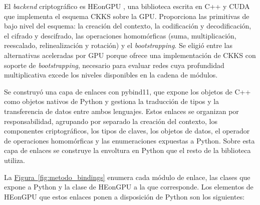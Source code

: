 El \textit{backend} criptográfico es HEonGPU \cite{HEonGPU}, una biblioteca escrita en C++ y CUDA que implementa el esquema CKKS sobre la GPU. Proporciona las primitivas de bajo nivel del esquema: la creación del contexto, la codificación y decodificación, el cifrado y descifrado, las operaciones homomórficas (suma, multiplicación, reescalado, relinealización y rotación) y el \textit{bootstrapping}. Se eligió entre las alternativas aceleradas por GPU porque ofrece una implementación de CKKS con soporte de \textit{bootstrapping}, necesario para evaluar redes cuya profundidad multiplicativa excede los niveles disponibles en la cadena de módulos.

Se construyó una capa de enlaces con pybind11, que expone los objetos de C++ como objetos nativos de Python y gestiona la traducción de tipos y la transferencia de datos entre ambos lenguajes. Estos enlaces se organizan por responsabilidad, agrupando por separado la creación del contexto, los componentes criptográficos, los tipos de claves, los objetos de datos, el operador de operaciones homomórficas y las enumeraciones expuestas a Python. Sobre esta capa de enlaces se construye la envoltura en Python que el resto de la biblioteca utiliza.

La \hyperref[fig:metodo_bindings]{Figura~\ref{fig:metodo_bindings}} enumera cada módulo de enlace, las clases que expone a Python y la clase de HEonGPU a la que corresponde. Los elementos de HEonGPU que estos enlaces ponen a disposición de Python son los siguientes:

